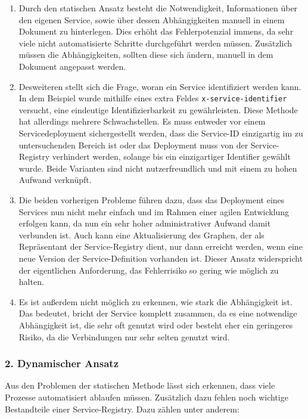\begin{enumerate}
	\item Durch den statischen Ansatz besteht die Notwendigkeit, Informationen über den eigenen Service, sowie über dessen Abhängigkeiten manuell in einem Dokument zu hinterlegen. Dies erhöht das Fehlerpotenzial immens, da sehr viele nicht automatisierte Schritte durchgeführt werden müssen. Zusätzlich müssen die Abhängigkeiten, sollten diese sich ändern, manuell in dem Dokument angepasst werden.
	\item Desweiteren stellt sich die Frage, woran ein Service identifiziert werden kann. In dem Beispiel wurde mithilfe eines extra Feldes \texttt{x-service-identifier} versucht, eine eindeutige Identifizierbarkeit zu gewährleisten. Diese Methode hat allerdings mehrere Schwachstellen. Es muss entweder vor einem Servicedeployment sichergestellt werden, dass die Service-ID einzigartig im zu untersuchenden Bereich ist oder das Deployment muss von der Service-Registry verhindert werden, solange bis ein einzigartiger Identifier gewählt wurde. Beide Varianten sind nicht nutzerfreundlich und mit einem zu hohen Aufwand verknüpft.
	\item Die beiden vorherigen Probleme führen dazu, dass das Deployment eines Services nun nicht mehr einfach und im Rahmen einer agilen Entwicklung erfolgen kann, da nun ein sehr hoher administrativer Aufwand damit verbunden ist. Auch kann eine Aktualisierung des Graphen, der als Repräsentant der Service-Registry dient, nur dann erreicht werden, wenn eine neue Version der Service-Definition vorhanden ist. Dieser Ansatz widerspricht der eigentlichen Anforderung, das Fehlerrisiko so gering wie möglich zu halten.
	\item Es ist außerdem nicht möglich zu erkennen, wie stark die Abhängigkeit ist. Das bedeutet, bricht der Service komplett zusammen, da es eine notwendige Abhängigkeit ist, die sehr oft genutzt wird oder besteht eher ein geringeres Risiko, da die Verbindungen nur sehr selten genutzt wird.
\end{enumerate}

\subsubsection*{2. Dynamischer Ansatz}

Aus den Problemen der statischen Methode lässt sich erkennen, dass viele Prozesse automatisiert ablaufen müssen. Zusätzlich dazu fehlen noch wichtige Bestandteile einer Service-Registry. Dazu zählen unter anderem:


